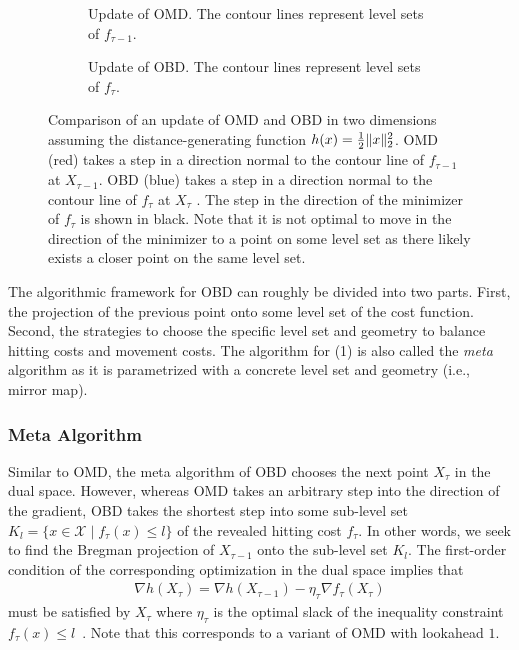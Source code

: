 \begin{figure}
    \begin{subfigure}[b]{\textwidth}
    \centering
    
    \caption{Update of OMD. The contour lines represent level sets of $f_{\tau-1}$.}
    \end{subfigure}
    \par\bigskip
    \begin{subfigure}[b]{\textwidth}
    \centering
    
    \caption{Update of OBD. The contour lines represent level sets of $f_{\tau}$.}
    \end{subfigure}
    \caption{Comparison of an update of OMD and OBD in two dimensions assuming the distance-generating function $h(x) = \frac{1}{2} \lVert x\rVert_2^2$. OMD (red) takes a step in a direction normal to the contour line of $f_{\tau-1}$ at $X_{\tau-1}$. OBD (blue) takes a step in a direction normal to the contour line of $f_{\tau}$ at $X_{\tau}$ \cite{Goel2018}. The step in the direction of the minimizer of $f_{\tau}$ is shown in black. Note that it is not optimal to move in the direction of the minimizer to a point on some level set as there likely exists a closer point on the same level set.}
    \label{fig:comparison_of_an_update_of_omd_and_obd}
\end{figure}

The algorithmic framework for OBD can roughly be divided into two parts. First, the projection of the previous point onto some level set of the cost function.  Second, the strategies to choose the specific level set and geometry to balance hitting costs and movement costs. The algorithm for (1) is also called the \emph{meta} algorithm as it is parametrized with a concrete level set and geometry (i.e., mirror map).

\subsubsection{Meta Algorithm}

Similar to OMD, the meta algorithm of OBD chooses the next point $X_{\tau}$ in the dual space. However, whereas OMD takes an arbitrary step into the direction of the gradient, OBD takes the shortest step into some sub-level set $K_l = \{x \in \mathcal{X} \mid f_{\tau}(x) \leq l\}$ of the revealed hitting cost $f_{\tau}$. In other words, we seek to find the Bregman projection of $X_{\tau-1}$ onto the sub-level set $K_l$. The first-order condition of the corresponding optimization in the dual space implies that \begin{align}\label{eq:pbd:first_order_condition}
    \nabla h(X_{\tau}) = \nabla h(X_{\tau-1}) - \eta_{\tau} \nabla f_{\tau}(X_{\tau})
\end{align} must be satisfied by $X_{\tau}$ where $\eta_{\tau}$ is the optimal slack of the inequality constraint $f_{\tau}(x) \leq l$~\cite{Goel2018}. Note that this corresponds to a variant of OMD with lookahead $1$.

